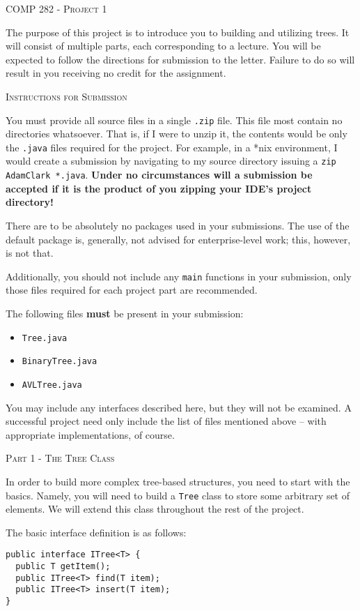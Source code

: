 \documentclass{letter}
\newcommand{\heading}[1]{{\large \textsc{#1}}}
\begin{document}
\heading{COMP 282 - Project 1}

The purpose of this project is to introduce you to building and utilizing
trees.  It will consist of multiple parts, each corresponding to a lecture.
You will be expected to follow the directions for submission to the letter.
Failure to do so will result in you receiving no credit for the assignment.

\heading{Instructions for Submission}

You must provide all source files in a single \texttt{.zip} file.  This file
most contain no directories whatsoever.  That is, if I were to unzip it, the
contents would be only the \texttt{.java} files required for the project.  For
example, in a *nix environment, I would create a submission by navigating to my
source directory issuing a \texttt{zip AdamClark *.java}.  {\bf Under no
circumstances will a submission be accepted if it is the product of you zipping
your IDE's project directory!}

There are to be absolutely no packages used in your submissions.  The use of
the default package is, generally, not advised for enterprise-level work; this,
however, is not that.

Additionally, you should not include any \texttt{main} functions in your
submission, only those files required for each project part are recommended.

The following files {\bf must} be present in your submission:

\begin{itemize}
\item \texttt{Tree.java}
\item \texttt{BinaryTree.java}
\item \texttt{AVLTree.java}
\end{itemize}

You may include any interfaces described here, but they will not be examined.
A successful project need only include the list of files mentioned above --
with appropriate implementations, of course.

\heading{Part 1 - The Tree Class}

In order to build more complex tree-based structures, you need to start with
the basics.  Namely, you will need to build a \texttt{Tree} class to store some
arbitrary set of elements.  We will extend this class throughout the rest of
the project.

The basic interface definition is as follows:

\begin{verbatim}
public interface ITree<T> {
  public T getItem();
  public ITree<T> find(T item);
  public ITree<T> insert(T item);
}
\end{verbatim}
\end{document}
